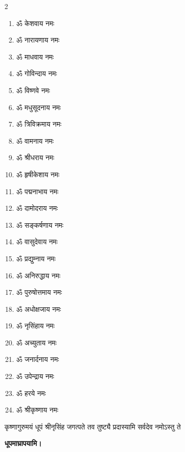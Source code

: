 \begin{center}
\begin{multicols}{2}
\begin{enumerate}
\item ॐ केशवाय नमः
\item ॐ नारायणाय नमः
\item ॐ माधवाय नमः
\item ॐ गोविन्दाय नमः
\item ॐ विष्णवे नमः	
\item ॐ मधुसूदनाय नमः
\item ॐ त्रिविक्रमाय नमः
\item ॐ वामनाय नमः
\item ॐ श्रीधराय नमः
\item ॐ हृषीकेशाय नमः
\item ॐ पद्मनाभाय नमः
\item ॐ दामोदराय नमः
\item ॐ सङ्कर्षणाय नमः
\item ॐ वासुदेवाय नमः
\item ॐ प्रद्युम्नाय नमः
\item ॐ अनिरुद्धाय नमः
\item ॐ पुरुषोत्तमाय नमः
\item ॐ अधोक्षजाय नमः
\item ॐ नृसिंहाय नमः
\item ॐ अच्युताय नमः
\item ॐ जनार्दनाय नमः
\item ॐ उपेन्द्राय नमः
\item ॐ हरये नमः
\item ॐ श्रीकृष्णाय नमः
\end{enumerate}
\end{multicols}

\begingroup
\centering
\setlength{\columnseprule}{1pt}
\let\chapt\sect

\endgroup



\twolineshloka
{कृष्णागुरुमयं धूपं श्रीनृसिंह जगत्पते}
{तव तुष्ट्यै प्रदास्यामि सर्वदेव नमोऽस्तु ते\footnotemark} %


\textbf{\devAya{} धूपमाघ्रापयामि।}\medskip



\end{center}
